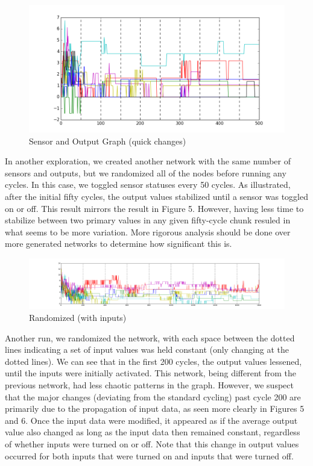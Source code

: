 \documentclass[12pt]{article}
\begin{document}
\begin{figure}[H]
    \centering
    \includegraphics[width=\linewidth]{../visualizations/8knodes_quick_changes.png}
    \caption{Sensor and Output Graph (quick changes)}
\end{figure}

In another exploration, we created another network with the same number of sensors and outputs, but we randomized all of the nodes before running any cycles.  In this case, we toggled sensor statuses every 50 cycles.  As illustrated, after the initial fifty cycles, the output values stabilized until a sensor was toggled on or off.  This result mirrors the result in Figure 5.  However, having less time to stabilize between two primary values in any given fifty-cycle chunk resuled in what seems to be more variation.  More rigorous analysis should be done over more generated networks to determine how significant this is.

\begin{figure}[H]
    \includegraphics[width=\linewidth]{../visualizations/8knodes_sensors_lineannotated.png}
    \caption{Randomized (with inputs)}
\end{figure}

Another run, we randomized the network, with each space between the dotted lines indicating a set of input values was held constant (only changing at the dotted lines).  We can see that in the first 200 cycles, the output values lessened, until the inputs were initially activated.  This network, being different from the previous network, had less chaotic patterns in the graph.  However, we suspect that the major changes (deviating from the standard cycling) past cycle 200 are primarily due to the propagation of input data, as seen more clearly in Figures 5 and 6.  Once the input data were modified, it appeared as if the average output value also changed as long as the input data then remained constant, regardless of whether inputs were turned on or off.  Note that this change in output values occurred for both inputs that were turned on and inputs that were turned off.
\end{document}

